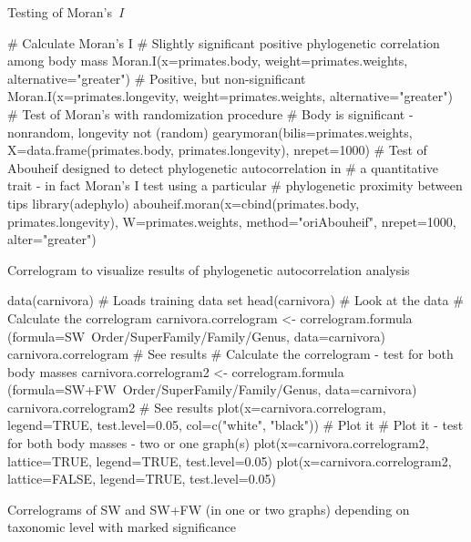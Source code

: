 \documentclass[compress, ucs, xelatex, 11pt, xcolor=svgnames, aspectratio=169,
	hyperref={
		bookmarks=true,
		unicode=true,
		colorlinks=true,
		pdftitle={Molecular data in R},
		plainpages=false,
		pdfauthor={Vojtech Zeisek},
		pdfsubject={Course about phylogeny and evolution in R},
		pdfcreator={XeLaTeX},
		pdfkeywords={R, evolution, phylogeny, molecular data},
		linkcolor=Crimson, %
		anchorcolor=Magenta, %
		citecolor=Magenta, %
		filecolor=Magenta, %
		menucolor=Magenta, %
		urlcolor=DodgerBlue, %
		pdftex},
	url={hyphens, lowtilde} %
	]{beamer}
\renewcommand{\texttt}[1]{\colorbox{Beige}{{\ttfamily #1}}}
\begin{document}
\begin{frame}[fragile]{Testing of Moran's~\textit{I}}
	\begin{spluscode}
    # Calculate Moran's I
    # Slightly significant positive phylogenetic correlation among body mass
    Moran.I(x=primates.body, weight=primates.weights, alternative="greater")
    # Positive, but non-significant
    Moran.I(x=primates.longevity, weight=primates.weights,
      alternative="greater")
    # Test of Moran's with randomization procedure
    # Body is significant - nonrandom, longevity not (random)
    gearymoran(bilis=primates.weights, X=data.frame(primates.body,
      primates.longevity), nrepet=1000)
    # Test of Abouheif designed to detect phylogenetic autocorrelation in
    # a quantitative trait - in fact Moran's I test using a particular
    # phylogenetic proximity between tips
    library(adephylo)
    abouheif.moran(x=cbind(primates.body, primates.longevity),
      W=primates.weights, method="oriAbouheif", nrepet=1000, alter="greater")
	\end{spluscode}
\end{frame}

\begin{frame}[fragile]{Correlogram to visualize results of phylogenetic autocorrelation analysis}
	\begin{spluscode}
    data(carnivora) # Loads training data set
    head(carnivora) # Look at the data
    # Calculate the correlogram
    carnivora.correlogram <- correlogram.formula
      (formula=SW~Order/SuperFamily/Family/Genus, data=carnivora)
    carnivora.correlogram # See results
    # Calculate the correlogram - test for both body masses
    carnivora.correlogram2 <- correlogram.formula
      (formula=SW+FW~Order/SuperFamily/Family/Genus, data=carnivora)
    carnivora.correlogram2 # See results
    plot(x=carnivora.correlogram, legend=TRUE, test.level=0.05, col=c("white",
      "black")) # Plot it
    # Plot it - test for both body masses - two or one graph(s)
    plot(x=carnivora.correlogram2, lattice=TRUE, legend=TRUE, test.level=0.05)
    plot(x=carnivora.correlogram2, lattice=FALSE, legend=TRUE, test.level=0.05)
	\end{spluscode}
\end{frame}

\begin{frame}{Correlograms of SW and SW+FW (in one or two graphs) depending on taxonomic level with marked significance}
	\texttt{[image: correlog.png]}
\end{frame}
\end{document}
